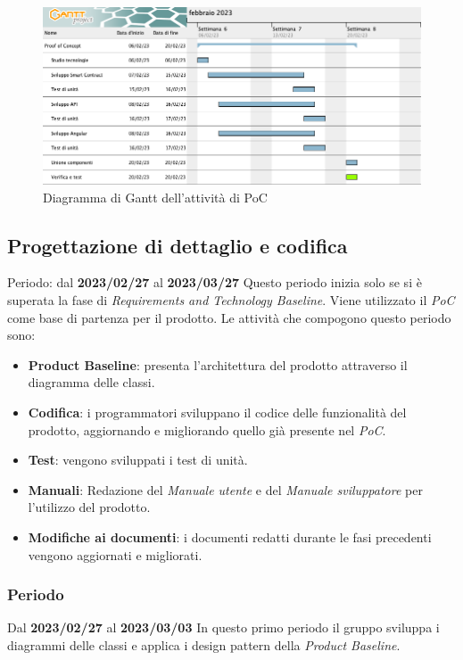 \begin{figure}[H]
    \centering
    \includegraphics[scale=0.4]{src/img/Gantt PoC.png}
    \caption{Diagramma di Gantt dell'attività di PoC}
\end{figure}

\subsection{Progettazione di dettaglio e codifica}
Periodo: dal \textbf{2023/02/27} al \textbf{2023/03/27} \newline
Questo periodo inizia solo se si è superata la fase di \textit{Requirements and Technology Baseline}. Viene utilizzato il \textit{PoC}
come base di partenza per il prodotto. Le attività che compogono questo periodo sono:
\begin{itemize}
        \item \textbf{Product Baseline\glo}: presenta l'architettura del prodotto attraverso il diagramma delle classi.
        \item \textbf{Codifica}: i programmatori sviluppano il codice delle funzionalità del prodotto, aggiornando e migliorando quello già presente nel \textit{PoC}.
        \item \textbf{Test}: vengono sviluppati i test di unità.
        \item \textbf{Manuali}: Redazione del \textit{Manuale utente} e del \textit{Manuale sviluppatore} per l'utilizzo del prodotto.
        \item \textbf{Modifiche ai documenti}: i documenti redatti durante le fasi precedenti vengono aggiornati e migliorati.
\end{itemize}

\subsubsection{ Periodo}
Dal \textbf{2023/02/27} al \textbf{2023/03/03}
\newline
In questo primo periodo il gruppo sviluppa i diagrammi delle classi e applica i design pattern della \textit{Product Baseline}.
